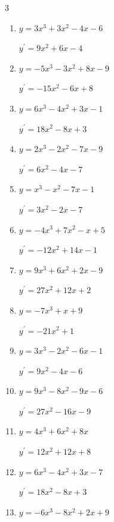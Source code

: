\begin{multicols}{3}
\begin{enumerate}
  \item $y=3x^{3}+3x^{2}-4x-6$

        $\displaystyle y^{\prime}=9x^{2}+6x-4$

  \item $y=-5x^{3}-3x^{2}+8x-9$

        $\displaystyle y^{\prime}=-15x^{2}-6x+8$

  \item $y=6x^{3}-4x^{2}+3x-1$

        $\displaystyle y^{\prime}=18x^{2}-8x+3$

  \item $y=2x^{3}-2x^{2}-7x-9$

        $\displaystyle y^{\prime}=6x^{2}-4x-7$

  \item $y=x^{3}-x^{2}-7x-1$

        $\displaystyle y^{\prime}=3x^{2}-2x-7$

  \item $y=-4x^{3}+7x^{2}-x+5$

        $\displaystyle y^{\prime}=-12x^{2}+14x-1$

  \item $y=9x^{3}+6x^{2}+2x-9$

        $\displaystyle y^{\prime}=27x^{2}+12x+2$

  \item $y=-7x^{3}+x+9$

        $\displaystyle y^{\prime}=-21x^{2}+1$

  \item $y=3x^{3}-2x^{2}-6x-1$

        $\displaystyle y^{\prime}=9x^{2}-4x-6$

  \item $y=9x^{3}-8x^{2}-9x-6$

        $\displaystyle y^{\prime}=27x^{2}-16x-9$

  \item $y=4x^{3}+6x^{2}+8x$

        $\displaystyle y^{\prime}=12x^{2}+12x+8$

  \item $y=6x^{3}-4x^{2}+3x-7$

        $\displaystyle y^{\prime}=18x^{2}-8x+3$

\columnbreak %

\resetques

  \item $y=-6x^{3}-8x^{2}+2x+9$


\end{enumerate}
\end{multicols}
